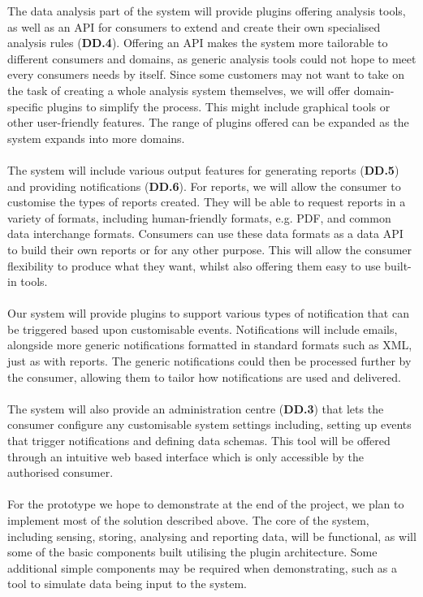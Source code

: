 \documentclass[10pt,a4paper]{article}
\begin{document}
The data analysis part of the system will provide plugins offering analysis
tools, as well as an API for consumers to extend and create their own
specialised analysis rules (\textbf{DD.4}). Offering an API makes the system
more tailorable to different consumers and domains, as generic analysis tools
could not hope to meet every consumers needs by itself. Since some customers may
not want to take on the task of creating a whole analysis system themselves, we
will offer domain-specific plugins to simplify the process. This might include
graphical tools or other user-friendly features. The range of plugins offered
can be expanded as the system expands into more domains.
\\ \\
The system will include various output features for generating reports
(\textbf{DD.5}) and providing notifications (\textbf{DD.6}). For reports, we
will allow the consumer to customise the types of reports created. They will be
able to request reports in a variety of formats, including human-friendly
formats, e.g. PDF, and common data interchange formats. Consumers can use these
data formats as a data API to build their own reports or for any other purpose.
This will allow the consumer flexibility to produce what they want, whilst also
offering them easy to use built-in tools.
\\ \\
Our system will provide plugins to support various types of notification that
can be triggered based upon customisable events. Notifications will include 
emails, alongside more generic notifications formatted in standard formats such
as XML, just as with reports. The generic notifications could then be processed
further by the consumer, allowing them to tailor how notifications are used and
delivered.
\\ \\
The system will also provide an administration centre (\textbf{DD.3}) that lets
the consumer configure any customisable system settings including, setting up
events that trigger notifications and defining data schemas. This tool will be
offered through an intuitive web based interface which is only accessible by the
authorised consumer.
\\ \\
For the prototype we hope to demonstrate at the end of the project, we plan to
implement most of the solution described above. The core of the system,
including sensing, storing, analysing and reporting data, will be functional,
as will some of the basic components built utilising the plugin architecture.
Some additional simple components may be required when demonstrating, such as a
tool to simulate data being input to the system. 
\end{document}
